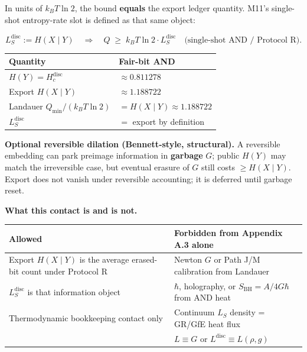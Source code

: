 \documentclass[
  11pt,
]{article}
\newcounter{none} %
\begin{document}
In units of \(k_B T\ln 2\), the bound \textbf{equals} the export ledger
quantity. M11's single-shot entropy-rate slot is defined as that same
object:

\[
L_S^{\mathrm{disc}} := H(X\mid Y)
\quad\Rightarrow\quad
Q \;\ge\; k_B T \ln 2 \cdot L_S^{\mathrm{disc}}
\quad\text{(single-shot AND / Protocol R)}.
\]

{\def\LTcaptype{none} %
\begin{longtable}[]{@{}ll@{}}
\toprule\noalign{}
Quantity & Fair-bit AND \\
\midrule\noalign{}
\endhead
\bottomrule\noalign{}
\endlastfoot
\(H(Y)=H_c^{\mathrm{disc}}\) & \(\approx 0.811278\) \\
Export \(H(X\mid Y)\) & \(\approx 1.188722\) \\
Landauer \(Q_{\min}/(k_B T\ln 2)\) & \(=H(X\mid Y)\approx 1.188722\) \\
\(L_S^{\mathrm{disc}}\) & \(=\) export by definition \\
\end{longtable}
}

\textbf{Optional reversible dilation (Bennett-style, structural).} A
reversible embedding can park preimage information in \textbf{garbage}
\(G\); public \(H(Y)\) may match the irreversible case, but eventual
erasure of \(G\) still costs \(\ge H(X\mid Y)\). Export does not vanish
under reversible accounting; it is deferred until garbage reset.

\textbf{What this contact is and is not.}

{\def\LTcaptype{none} %
\begin{longtable}[]{@{}
  >{\raggedright\arraybackslash}p{}
  >{\raggedright\arraybackslash}p{}@{}}
\toprule\noalign{}
\begin{minipage}[b]{\linewidth}\raggedright
Allowed
\end{minipage} & \begin{minipage}[b]{\linewidth}\raggedright
Forbidden from Appendix A.3 alone
\end{minipage} \\
\midrule\noalign{}
\endhead
\bottomrule\noalign{}
\endlastfoot
Export \(H(X\mid Y)\) is the average erased-bit count under Protocol R &
Newton \(G\) or Path J/M calibration from Landauer \\
\(L_S^{\mathrm{disc}}\) is that information object & \(\hbar\),
holography, or \(S_{\mathrm{BH}}=A/4G\hbar\) from AND heat \\
Thermodynamic bookkeeping contact only & Continuum \(L_S\) density =
GR/GfE heat flux \\
& \(L\equiv G\) or \(L^{\mathrm{disc}}\equiv L(\rho,g)\) \\
\end{longtable}
}
\end{document}
